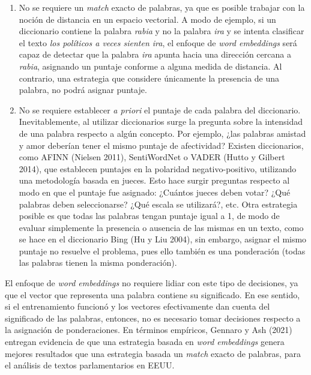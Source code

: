 \documentclass[
  12pt,
]{article}
\begin{document}
\begin{enumerate}
\def\labelenumi{\arabic{enumi}.}
\item
  No se requiere un \emph{match} exacto de palabras, ya que es posible
  trabajar con la noción de distancia en un espacio vectorial. A modo de
  ejemplo, si un diccionario contiene la palabra \emph{rabia} y no la
  palabra \emph{ira} y se intenta clasificar el texto \emph{los
  políticos a veces sienten ira}, el enfoque de \emph{word embeddings}
  será capaz de detectar que la palabra \emph{ira} apunta hacia una
  dirección cercana a \emph{rabia}, asignando un puntaje conforme a
  alguna medida de distancia. Al contrario, una estrategia que considere
  únicamente la presencia de una palabra, no podrá asignar puntaje.
\item
  No se requiere establecer \emph{a priori} el puntaje de cada palabra
  del diccionario. Inevitablemente, al utilizar diccionarios surge la
  pregunta sobre la intensidad de una palabra respecto a algún concepto.
  Por ejemplo, ¿las palabras amistad y amor deberían tener el mismo
  puntaje de afectividad? Existen diccionarios, como AFINN (Nielsen
  2011), SentiWordNet o VADER (Hutto y Gilbert 2014), que establecen
  puntajes en la polaridad negativo-positivo, utilizando una metodología
  basada en jueces. Esto hace surgir preguntas respecto al modo en que
  el puntaje fue asignado: ¿Cuántos jueces deben votar? ¿Qué palabras
  deben seleccionarse? ¿Qué escala se utilizará?, etc. Otra estrategia
  posible es que todas las palabras tengan puntaje igual a 1, de modo de
  evaluar simplemente la presencia o ausencia de las mismas en un texto,
  como se hace en el diccionario Bing (Hu y Liu 2004), sin embargo,
  asignar el mismo puntaje no resuelve el problema, pues ello también es
  una ponderación (todas las palabras tienen la misma ponderación).
\end{enumerate}

El enfoque de \emph{word embeddings} no requiere lidiar con este tipo de
decisiones, ya que el vector que representa una palabra contiene su
significado. En ese sentido, si el entrenamiento funcionó y los vectores
efectivamente dan cuenta del significado de las palabras, entonces, no
es necesario tomar decisiones respecto a la asignación de ponderaciones.
En términos empíricos, Gennaro y Ash (2021) entregan evidencia de que
una estrategia basada en \emph{word embeddings} genera mejores
resultados que una estrategia basada un \emph{match} exacto de palabras,
para el análisis de textos parlamentarios en EEUU.
\end{document}
